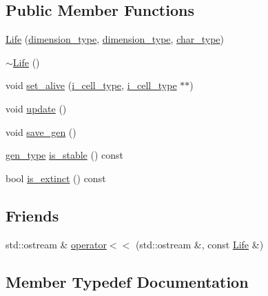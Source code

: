 \subsection*{Public Member Functions}
\begin{DoxyCompactItemize}
\item 
\hyperlink{classlg_1_1Life_af271348862fd51ef943c4fcfd33b277d}{Life} (\hyperlink{classlg_1_1Life_a05357ceab438f920c6f3dbdde93f28be}{dimension\+\_\+type}, \hyperlink{classlg_1_1Life_a05357ceab438f920c6f3dbdde93f28be}{dimension\+\_\+type}, \hyperlink{classlg_1_1Life_a9d2980d7a77c0b01c639a013765869db}{char\+\_\+type})
\item 
\hyperlink{classlg_1_1Life_a51ad6463fade663371a346415ed08ea2}{$\sim$\+Life} ()
\item 
void \hyperlink{classlg_1_1Life_a2cf5eda06fa7f1858f91af1edb667bb0}{set\+\_\+alive} (\hyperlink{classlg_1_1Life_a35201ae72bdab2eb51e6d9782b48a920}{i\+\_\+cell\+\_\+type}, \hyperlink{classlg_1_1Life_a35201ae72bdab2eb51e6d9782b48a920}{i\+\_\+cell\+\_\+type} $\ast$$\ast$)
\item 
void \hyperlink{classlg_1_1Life_a20c4962e8009b6604e14c61e677dc51c}{update} ()
\item 
void \hyperlink{classlg_1_1Life_aba1f1bbd7a45c9a8bd33b1b077ac1c1e}{save\+\_\+gen} ()
\item 
\hyperlink{classlg_1_1Life_a31abf1588df7f6f299cadce0ab6da9f9}{gen\+\_\+type} \hyperlink{classlg_1_1Life_af20c8252f980eacc561a19dd0fc99a29}{is\+\_\+stable} () const 
\item 
bool \hyperlink{classlg_1_1Life_ac4f6ba39c03e7986f73dc107333407f5}{is\+\_\+extinct} () const 
\end{DoxyCompactItemize}
\subsection*{Friends}
\begin{DoxyCompactItemize}
\item 
std\+::ostream \& \hyperlink{classlg_1_1Life_adffe762ef7508d96b558e2f38baaad93}{operator$<$$<$} (std\+::ostream \&, const \hyperlink{classlg_1_1Life}{Life} \&)
\end{DoxyCompactItemize}


\subsection{Member Typedef Documentation}
